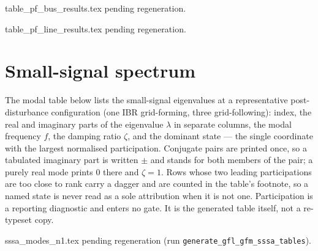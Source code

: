 \documentclass[12pt,a4paper]{article}
\theoremstyle{remark}
\begin{document}
\begin{table}[H]
\centering\footnotesize
\caption{Solved bus power flow at the SG-online operating point (per unit on the
system base; angles in degrees).}
\label{tab:pfbus}
 {}
 {\centering\ttfamily table\_pf\_bus\_results.tex pending regeneration.}
\end{table}

\begin{table}[H]
\centering\footnotesize
\caption{Branch power flows and losses at the SG-online operating point.}
\label{tab:pfline}
 {}
 {\centering\ttfamily table\_pf\_line\_results.tex pending regeneration.}
\end{table}

\section{Small-signal spectrum}\label{sec:sssa}
The modal table below lists the small-signal eigenvalues at a representative
post-disturbance configuration (one IBR grid-forming, three grid-following):
index, the real and imaginary parts of the eigenvalue $\lambda$ in separate
columns, the modal frequency $f$, the damping ratio $\zeta$, and the dominant
state --- the single coordinate with the largest normalised participation.
Conjugate pairs are printed once, so a tabulated imaginary part is written $\pm$
and stands for both members of the pair; a purely real mode prints $0$ there and
$\zeta=1$. Rows whose two leading participations are too close to rank carry a
dagger and are counted in the table's footnote, so a named state is never read
as a sole attribution when it is not one. Participation is a reporting
diagnostic and enters no gate. It is the generated table itself, not a
re-typeset copy.

\begin{center}\footnotesize
{}
 {}
 {\ttfamily sssa\_modes\_n1.tex pending regeneration
  (run \texttt{generate\_gfl\_gfm\_sssa\_tables}).}
\end{center}
\end{document}
